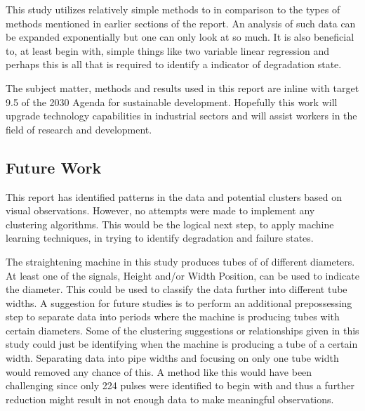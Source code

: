 \documentclass[]{article}
\begin{document}
This study utilizes relatively simple methods to in comparison to the types of methods mentioned in earlier sections of the report. An analysis of such data can be expanded exponentially but one can only look at so much. It is also beneficial to, at least begin with, simple things like two variable linear regression and perhaps this is all that is required to identify a indicator of degradation state.

The subject matter, methods and results used in this report are inline with target 9.5 of the 2030 Agenda for sustainable development\cite{united2015department}. Hopefully this work will upgrade technology capabilities in industrial sectors and will assist workers in the field of research and development. 

\subsection{Future Work}
This report has identified patterns in the data and potential clusters based on visual observations. However, no attempts were made to implement any clustering algorithms. This would be the logical next step, to apply machine learning techniques, in trying to identify degradation and failure states.

The straightening machine in this study produces tubes of of different diameters. At least one of the signals, Height and/or Width Position, can be used to indicate the diameter. This could be used to classify the data further into different tube widths. A suggestion for future studies is to perform an additional prepossessing step to separate data into periods where the machine is producing tubes with certain diameters. Some of the clustering suggestions or relationships given in this study could just be identifying when the machine is producing a tube of a certain width. Separating data into pipe widths and focusing on only one tube width would removed any chance of this. A method like this would have been challenging since only 224 pulses were identified to begin with and thus a further reduction might result in not enough data to make meaningful observations.
\end{document}
